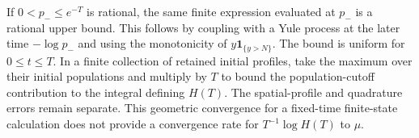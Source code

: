 If $0<p_-\le e^{-T}$ is rational, the same finite expression evaluated
at $p_-$ is a rational upper bound. This follows by coupling with a
Yule process at the later time $-\log p_-$ and using the monotonicity
of $y\mathbf1_{\{y>N\}}$. The bound is uniform for $0\le t\le T$.
In a finite collection of retained initial profiles, take the maximum
over their initial populations and multiply by $T$ to bound the
population-cutoff contribution to the integral defining $H(T)$.
The spatial-profile and quadrature errors remain separate. This
geometric convergence for a fixed-time finite-state calculation does
not provide a convergence rate for $T^{-1}\log H(T)$ to $\mu$.
